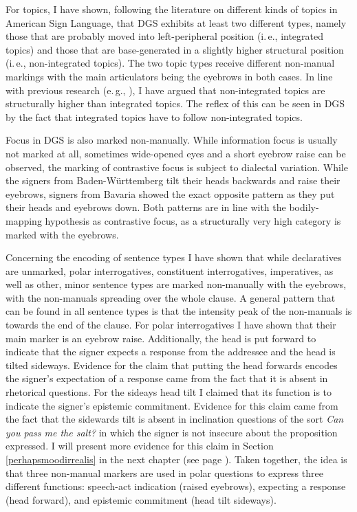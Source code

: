 For topics, I have shown, following the literature on different kinds of topics in American Sign Language, that DGS exhibits at least two different types, namely those that are probably moved into left-peripheral position (i.\,e., integrated topics) and those that are base-generated in a slightly higher structural position (i.\,e., non-integrated topics). The two topic types receive different non-manual markings with the main articulators being the eyebrows in both cases. In line with previous research (e.\,g., \citealt{benincapol2004topic}), I have argued that non-integrated topics are structurally higher than integrated topics. The reflex of this can be seen in DGS by the fact that integrated topics have to follow non-integrated topics.

Focus in DGS is also marked non-manually. While information focus is usually not marked at all, sometimes wide-opened eyes and a short eyebrow raise can be observed, the marking of contrastive focus is subject to dialectal variation. While the signers from Baden-Württemberg tilt their heads backwards and raise their eyebrows, signers from Bavaria showed the exact opposite pattern as they put their heads and eyebrows down. Both patterns are in line with the bodily-mapping hypothesis as contrastive focus, as a structurally very high category is marked with the eyebrows. 

Concerning the encoding of sentence types I have shown that while declaratives are unmarked, polar interrogatives, constituent interrogatives, imperatives, as well as other, minor sentence types are marked non-manually with the eyebrows, with the non-manuals spreading over the whole clause. A general pattern that can be found in all sentence types is that the intensity peak of the non-manuals is towards the end of the clause. For polar interrogatives I have shown that their main marker is an eyebrow raise. Additionally, the head is put forward to indicate that the signer expects a response from the addressee and the head is tilted sideways. Evidence for the claim that putting the head forwards encodes the signer's expectation of a response came from the fact that it is absent in rhetorical questions. For the sideays head tilt I claimed that its function is to indicate the signer's epistemic commitment. Evidence for this claim came from the fact that the sidewards tilt is absent in inclination questions of the sort \textit{Can you pass me the salt?} in which the signer is not insecure about the proposition expressed. I will present more evidence for this claim in Section \ref{perhapsmoodirrealis} in the next chapter (see page \pageref{perhapsmoodirrealis}). Taken together, the idea is that three non-manual markers are used in polar questions to express three different functions: speech-act indication (raised eyebrows), expecting a response (head forward), and epistemic commitment (head tilt sideways). 

